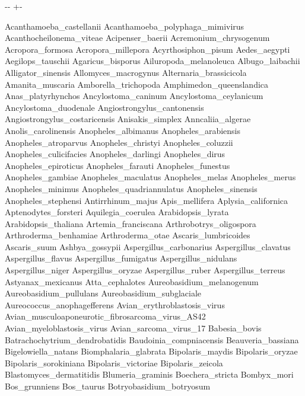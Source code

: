\documentclass[letterpaper,10pt,english]{sphinxmanual}
\newlength\nbsphinxcodecellspacing
\begin{document}
{

\kern-\sphinxverbatimsmallskipamount\kern-\baselineskip
\kern+\FrameHeightAdjust\kern-\fboxrule
\vspace{\nbsphinxcodecellspacing}

\begin{sphinxVerbatim}[commandchars=\\\{\}]
Acanthamoeba\_castellanii
Acanthamoeba\_polyphaga\_mimivirus
Acanthocheilonema\_viteae
Acipenser\_baerii
Acremonium\_chrysogenum
Acropora\_formosa
Acropora\_millepora
Acyrthosiphon\_pisum
Aedes\_aegypti
Aegilops\_tauschii
Agaricus\_bisporus
Ailuropoda\_melanoleuca
Albugo\_laibachii
Alligator\_sinensis
Allomyces\_macrogynus
Alternaria\_brassicicola
Amanita\_muscaria
Amborella\_trichopoda
Amphimedon\_queenslandica
Anas\_platyrhynchos
Ancylostoma\_caninum
Ancylostoma\_ceylanicum
Ancylostoma\_duodenale
Angiostrongylus\_cantonensis
Angiostrongylus\_costaricensis
Anisakis\_simplex
Anncaliia\_algerae
Anolis\_carolinensis
Anopheles\_albimanus
Anopheles\_arabiensis
Anopheles\_atroparvus
Anopheles\_christyi
Anopheles\_coluzzii
Anopheles\_culicifacies
Anopheles\_darlingi
Anopheles\_dirus
Anopheles\_epiroticus
Anopheles\_farauti
Anopheles\_funestus
Anopheles\_gambiae
Anopheles\_maculatus
Anopheles\_melas
Anopheles\_merus
Anopheles\_minimus
Anopheles\_quadriannulatus
Anopheles\_sinensis
Anopheles\_stephensi
Antirrhinum\_majus
Apis\_mellifera
Aplysia\_californica
Aptenodytes\_forsteri
Aquilegia\_coerulea
Arabidopsis\_lyrata
Arabidopsis\_thaliana
Artemia\_franciscana
Arthrobotrys\_oligospora
Arthroderma\_benhamiae
Arthroderma\_otae
Ascaris\_lumbricoides
Ascaris\_suum
Ashbya\_gossypii
Aspergillus\_carbonarius
Aspergillus\_clavatus
Aspergillus\_flavus
Aspergillus\_fumigatus
Aspergillus\_nidulans
Aspergillus\_niger
Aspergillus\_oryzae
Aspergillus\_ruber
Aspergillus\_terreus
Astyanax\_mexicanus
Atta\_cephalotes
Aureobasidium\_melanogenum
Aureobasidium\_pullulans
Aureobasidium\_subglaciale
Aureococcus\_anophagefferens
Avian\_erythroblastosis\_virus
Avian\_musculoaponeurotic\_fibrosarcoma\_virus\_AS42
Avian\_myeloblastosis\_virus
Avian\_sarcoma\_virus\_17
Babesia\_bovis
Batrachochytrium\_dendrobatidis
Baudoinia\_compniacensis
Beauveria\_bassiana
Bigelowiella\_natans
Biomphalaria\_glabrata
Bipolaris\_maydis
Bipolaris\_oryzae
Bipolaris\_sorokiniana
Bipolaris\_victoriae
Bipolaris\_zeicola
Blastomyces\_dermatitidis
Blumeria\_graminis
Boechera\_stricta
Bombyx\_mori
Bos\_grunniens
Bos\_taurus
Botryobasidium\_botryosum

\end{sphinxVerbatim}}
\end{document}
